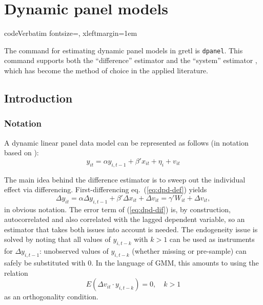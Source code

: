 \chapter{Dynamic panel models}
\label{chap:dpanel}

\newcommand{\by}{\boldsymbol{y}}
\newcommand{\bx}{\boldsymbol{x}}
\newcommand{\bv}{\boldsymbol{v}}
\newcommand{\bX}{\boldsymbol{X}}
\newcommand{\bW}{\boldsymbol{W}}
\newcommand{\bZ}{\boldsymbol{Z}}
\newcommand{\bA}{\boldsymbol{A}}
\newcommand{\biota}{\bm{\iota}}

\DefineVerbatimEnvironment%
{code}{Verbatim}
{fontsize=\small, xleftmargin=1em}

\newenvironment%
{altcode}%
{\vspace{1ex}\small\leftmargin 1em}{\vspace{1ex}}

The command for estimating dynamic panel models in gretl is
\texttt{dpanel}. This command supports both the ``difference''
estimator \citep{arellano-bond91} and the ``system'' estimator
\citep{blundell-bond98}, which has become the method of choice in the
applied literature.

\section{Introduction}
\label{sec:dpanel-intro}

\subsection{Notation}
\label{sec:dpanel-notation}

A dynamic linear panel data model can be represented as follows
(in notation based on \cite{arellano03}):
\begin{equation}
  \label{eq:dpd-def}
  y_{it} = \alpha y_{i,t-1} + \beta'x_{it} + \eta_{i} + v_{it}
\end{equation}

The main idea behind the difference estimator is to sweep out the
individual effect via differencing.  First-differencing eq.\
(\ref{eq:dpd-def}) yields
\begin{equation}
  \label{eq:dpd-dif}
  \Delta y_{it} = \alpha \Delta y_{i,t-1} + \beta'\Delta x_{it} +
  \Delta v_{it} = \gamma' W_{it} + \Delta v_{it} ,
\end{equation}
in obvious notation. The error term of (\ref{eq:dpd-dif}) is, by
construction, autocorrelated and also correlated with the lagged
dependent variable, so an estimator that takes both issues into
account is needed. The endogeneity issue is solved by noting that all
values of $y_{i,t-k}$ with $k>1$ can be used as instruments for
$\Delta y_{i,t-1}$: unobserved values of $y_{i,t-k}$ (whether missing
or pre-sample) can safely be substituted with 0. In the language of
GMM, this amounts to using the relation
\begin{equation}
  \label{eq:OC-dif}
  E(\Delta v_{it} \cdot y_{i,t-k}) = 0, \quad k>1
\end{equation}
as an orthogonality condition.

